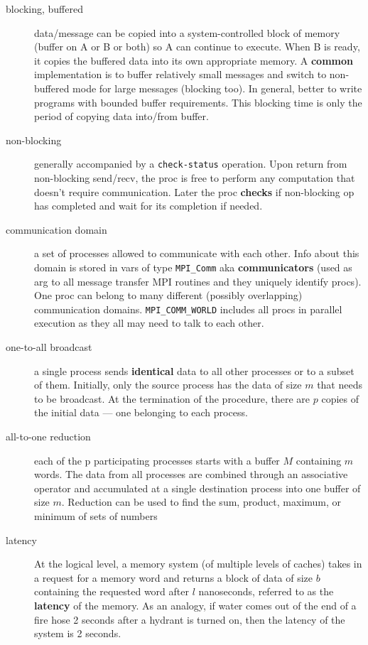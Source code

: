 \begin{description}
\item[blocking, buffered] data/message can be copied into a system-controlled block of memory (buffer on A or B or both) so A can continue to execute.  When B is ready, it copies the buffered data into its own appropriate memory.  A \textbf{common} implementation is to buffer relatively small messages and switch to non-buffered mode for large messages (blocking too).  In general, better to write programs with bounded buffer requirements.  This blocking time is only the period of copying data into/from buffer.
\item[non-blocking] generally accompanied by a \texttt{check-status} operation.  Upon return from non-blocking send/recv, the proc is free to perform any computation that doesn't require communication.  Later the proc \textbf{checks} if non-blocking op has completed and wait for its completion if needed.
\item[communication domain] a set of processes allowed to communicate with each other.  Info about this domain is stored in vars of type \texttt{MPI\_Comm} aka \textbf{communicators} (used as arg to all message transfer MPI routines and they uniquely identify procs). One proc can belong to many different (possibly overlapping) communication domains.  \texttt{MPI\_COMM\_WORLD} includes all procs in parallel execution as they all may need to talk to each other.

\item[one-to-all broadcast] a single process sends \textbf{identical} data to all other processes or to a subset of them.  Initially, only the source process has the data of size $m$ that needs to be broadcast.  At the termination of the procedure, there are $p$ copies of the initial data --- one belonging to each process.

\item[all-to-one reduction] each of the p participating processes starts with a buffer $M$ containing $m$ words.  The data from all processes are combined through an associative operator and accumulated at a single destination process into one buffer of size $m$.  Reduction can be used to find the sum, product, maximum, or minimum of sets of numbers

\item[latency] At the logical level, a memory system (of multiple levels of caches) takes in a request for a memory word and returns a block of data of size $b$ containing the requested word after $l$ nanoseconds, referred to as the \textbf{latency} of the memory.  As an analogy, if water comes out of the end of a fire hose 2 seconds after a hydrant is turned on, then the latency of the system is 2 seconds.



\end{description}
